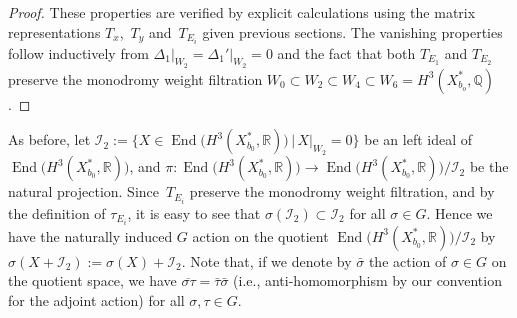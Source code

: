 \documentclass[10pt,a4paper]{amsart}
\numberwithin{equation}{section}
\begin{document}
\begin{proof} These properties are verified by explicit calculations using the matrix representa\-tions $T_{x}$,~$T_{y}$ and~$T_{E_{i}}$ given previous sections. The vanishing properties follow inductively from $\Delta_{1}\vert_{W_{2}}=\Delta_{1}'\vert_{W_{2}}=0$ and the fact that both $T_{E_{1}}$ and $T_{E_{2}}$ preserve the monodromy weight filtration $W_{0}\subset W_{2}\subset W_{4}\subset W_{6}=H^{3}(X_{b_{o}}^{*},\mathbb{Q})$.
\end{proof}

As before, let $\mathcal{I}_{2}:=\big\{ X\in\operatorname{End}\big(H^{3}(X_{b_{0}}^{*},\mathbb{R})\big)\,|\, X\vert_{W_{2}}=0\big\} $ be an left ideal of $\operatorname{End}\big(H^{3}(X_{b_{0}}^{*},\mathbb{R})\big)$, and $\pi\colon \operatorname{End}\big(H^{3}(X_{b_{0}}^{*},\mathbb{R})\big)\to\operatorname{End}\big(H^{3}(X_{b_{0}}^{*},\mathbb{R})\big)/\mathcal{I}_{2}$ be the natural projection. Since~$T_{E_{i}}$ preserve the monodromy weight filtration, and by the definition of $\tau_{E_{i}}$, it is easy to see that $\sigma(\mathcal{I}_{2})\subset\mathcal{I}_{2}$ for all $\sigma\in G$. Hence we have the naturally induced $G$ action on the quotient $\operatorname{End}\big(H^{3}(X_{b_{0}}^{*},\mathbb{R})\big)/\mathcal{I}_{2}$ by $\sigma(X+\mathcal{I}_{2}):=\sigma(X)+\mathcal{I}_{2}$. Note that, if we denote by $\bar{\sigma}$ the action of $\sigma\in G$ on the quotient space, we have $\overline{\sigma\tau}=\bar{\tau}\bar{\sigma}$ (i.e., anti-homomorphism by our convention for the adjoint action) for all $\sigma,\tau\in G$.
\end{document}
